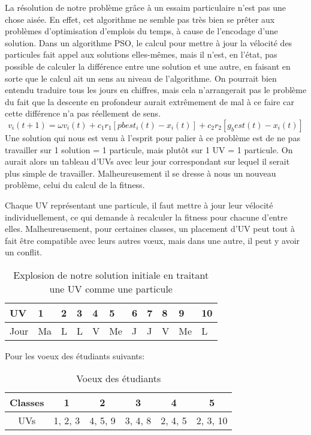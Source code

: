 
La résolution de notre problème grâce à un essaim particulaire n'est pas une chose aisée. En effet, cet algorithme ne semble pas très bien se prêter aux problèmes d'optimisation d'emplois du temps, à cause de l'encodage d'une solution. Dans un algorithme PSO, le calcul pour mettre à jour la vélocité des particules fait appel aux solutions elles-mêmes, mais il n'est, en l'état, pas possible de calculer la différence entre une solution et une autre, en faisant en sorte que le calcul ait un sens au niveau de l'algorithme. On pourrait bien entendu traduire tous les jours en chiffres, mais cela n'arrangerait pas le problème du fait que la descente en profondeur aurait extrêmement de mal à ce faire car cette différence n'a pas réellement de sens.
$$v_i(t + 1) = \omega v_i(t) + c_1 r_1 [pbest_i(t) - x_i(t)] + c_2 r_2 [g_best(t) - x_i(t)]$$
Une solution qui nous est venu à l'esprit pour palier à ce problème est de ne pas travailler sur 1 solution = 1 particule, mais plutôt sur 1 UV = 1 particule. On aurait alors un tableau d'UVs avec leur jour correspondant sur lequel il serait plus simple de travailler. Malheureusement il se dresse à nous un nouveau problème, celui du calcul de la fitness.

Chaque UV représentant une particule, il faut mettre à jour leur vélocité individuellement, ce qui demande à recalculer la fitness pour chacune d'entre elles. Malheureusement, pour certaines classes, un placement d'UV peut tout à fait être compatible avec leurs autres vœux, mais dans une autre, il peut y avoir un conflit.

\begin{table}[!h]
    \centering
    \begin{tabular}{|l|l|l|l|l|l|l|l|l|l|l|}
        \hline
    UV   & 1 & 2 & 3  & 4  & 5 & 6  & 7 & 8 & 9 & 10 \\
    \hline
    Jour & Ma & L & L & V & Me & J & J & V & Me & L \\
    \hline
    \end{tabular}
    \caption{Explosion de notre solution initiale en traitant une UV comme une particule}\label{tab:particules}
\end{table}

Pour les voeux des étudiants suivants:

\begin{table}[!h]
    \centering
    \begin{tabular}{|c|c|c|c|c|c|}
        \hline
        Classes & 1       & 2       & 3       & 4       & 5        \\
        \hline
        UVs     & 1, 2, 3 & 4, 5, 9 & 3, 4, 8 & 2, 4, 5 & 2, 3, 10 \\
        \hline
    \end{tabular}
    \caption{Voeux des étudiants}\label{tab:voeux-etudiant-particules}
\end{table}

